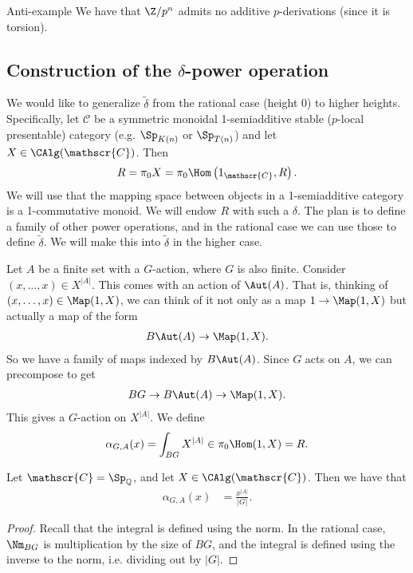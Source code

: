 \begin{customenvironment}{Anti-example} We have that $\Z/p^n$ admits no additive $p$-derivations (since it is torsion).
\end{customenvironment}

\subsection{Construction of the $\delta$-power operation}

We would like to generalize $\widetilde{\delta}$ from the rational case (height 0) to higher heights. Specifically, let $\mathscr{C}$ be a symmetric monoidal 1-semiadditive stable ($p$-local presentable) category (e.g. $\Sp_{K(n)}$ or $\Sp_{T(n)}$) and let $X \in \CAlg(\mathscr{C})$. Then
\begin{align*}
    R = \pi_0 X = \pi_0 \Hom \left( 1_\mathscr{C}, R \right).
\end{align*}
We will use that the mapping space between objects in a 1-semiadditive category is a 1-commutative monoid. We will endow $R$ with such a $\delta$. The plan is to define a family of other power operations, and in the rational case we can use those to define $\widetilde{\delta}$. We will make this into $\widetilde{\delta}$ in the higher case.

Let $A$ be a finite set with a $G$-action, where $G$ is also finite. Consider $(x, \ldots, x) \in X^{|A|}$. This comes with an action of $\Aut(A)$. That is, thinking of $(x, \ldots, x) \in \Map(1, X)$, we can think of it not only as a map $1 \to \Map(1,X)$ but actually a map of the form
\begin{align*}
    B\Aut(A) \to \Map(1,X).
\end{align*}
So we have a family of maps indexed by $B\Aut(A)$. Since $G$ acts on $A$, we can precompose to get
\begin{align*}
    BG \to B\Aut(A) \to \Map(1,X).
\end{align*}
This gives a $G$-action on $X^{|A|}$. We define
\begin{align*}
    \alpha_{G,A}(x) = \int_{BG} X^{|A|} \in \pi_0 \Hom(1,X) = R.
\end{align*}

\begin{proposition} Let $\mathscr{C} = \Sp_\mathbb{Q}$, and let $X\in \CAlg(\mathscr{C})$. Then we have that
\begin{align*}
    \alpha_{G,A}(x) &= \frac{x^{|A|}}{|G|}.
\end{align*}
\end{proposition}
\begin{proof} Recall that the integral is defined using the norm. In the rational case, $\Nm_{BG}$ is multiplication by the size of $BG$, and the integral is defined using the inverse to the norm, i.e. dividing out by $|G|$.
\end{proof}

